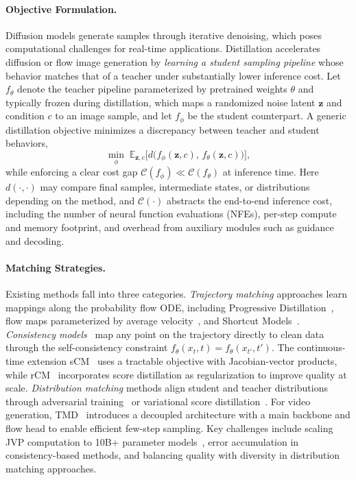 \paragraph{Objective Formulation.}
Diffusion models generate samples through iterative denoising, which poses computational challenges for real-time applications.
Distillation accelerates diffusion or flow image generation by \emph{learning a student sampling pipeline} whose behavior matches that of a teacher under substantially lower inference cost.
Let $f_{\theta}$ denote the teacher pipeline parameterized by pretrained weights $\theta$ and typically frozen during distillation, which maps a randomized noise latent $\mathbf{z}$ and condition $c$ to an image sample, and let $f_{\phi}$ be the student counterpart.
A generic distillation objective minimizes a discrepancy between teacher and student behaviors,
\begin{equation}
\min_{\phi}\;\mathbb{E}_{\mathbf{z},c}\Big[d\big(f_{\phi}(\mathbf{z},c),\,f_{\theta}(\mathbf{z},c)\big)\Big],
\label{eq:distill_generic}
\end{equation}
while enforcing a clear cost gap $\mathcal{C}(f_{\phi}) \ll \mathcal{C}(f_{\theta})$ at inference time.
Here $d(\cdot,\cdot)$ may compare final samples, intermediate states, or distributions depending on the method, and $\mathcal{C}(\cdot)$ abstracts the end-to-end inference cost, including the number of neural function evaluations (NFEs), per-step compute and memory footprint, and overhead from auxiliary modules such as guidance and decoding.

\paragraph{Matching Strategies.}
Existing methods fall into three categories. \textit{Trajectory matching} approaches learn mappings along the probability flow ODE, including Progressive Distillation~\citep{salimans2022progressive}, flow maps parameterized by average velocity~\citep{geng2025mean}, and Shortcut Models~\citep{frans2024one}. \textit{Consistency models}~\citep{song2023consistency} map any point on the trajectory directly to clean data through the self-consistency constraint $f_\theta(x_t, t) = f_\theta(x_{t'}, t')$. The continuous-time extension sCM~\citep{lu2024simplifying} uses a tractable objective with Jacobian-vector products, while rCM~\citep{zheng2025rcm} incorporates score distillation as regularization to improve quality at scale. \textit{Distribution matching} methods align student and teacher distributions through adversarial training~\citep{sauer2024adversarial} or variational score distillation~\citep{yin2024one,yin2024improved}. For video generation, TMD~\citep{nie2026tmd} introduces a decoupled architecture with a main backbone and flow head to enable efficient few-step sampling. Key challenges include scaling JVP computation to 10B+ parameter models~\citep{zheng2025rcm}, error accumulation in consistency-based methods, and balancing quality with diversity in distribution matching approaches.

